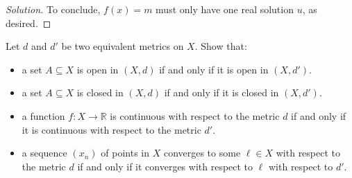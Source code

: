 \documentclass[11pt]{scrartcl}
\providecommand{\RR}{\mathbb R}
\providecommand{\ii}{\item}
\theoremstyle{problem}
\newenvironment{problem}[1]
{\renewcommand\theinnercustomthm{#1}\innercustomthm}
{\endinnercustomthm}
\theoremstyle{remark}
\newenvironment{soln}{\begin{proof}[Solution]}{\end{proof}}
\begin{document}
\begin{soln}
	To conclude, $f(x) = m$ must only have one real solution $u$,
	as desired.
\end{soln}

\begin{problem}{4}
	Let $d$ and $d'$ be two equivalent metrics on $X$. Show that:
	\begin{itemize}
		\ii a set $A\subseteq X$ is open in $(X, d)$ if and only if
		it is open in $(X, d')$.
		\ii a set $A\subseteq X$ is closed in $(X, d)$ if and only if
		it is closed in $(X, d')$.
		\ii a function $f\colon X\to\RR$ is continuous with respect to
		the metric $d$ if and only if it is continuous with respect to
		the metric $d'$.
		\ii a sequence $(x_n)$ of points in $X$ converges to some $\ell\in X$
		with respect to the metric $d$ if and only if
		it converges with respect to $\ell$ with respect to $d'$.
	\end{itemize}
\end{problem}
\end{document}

